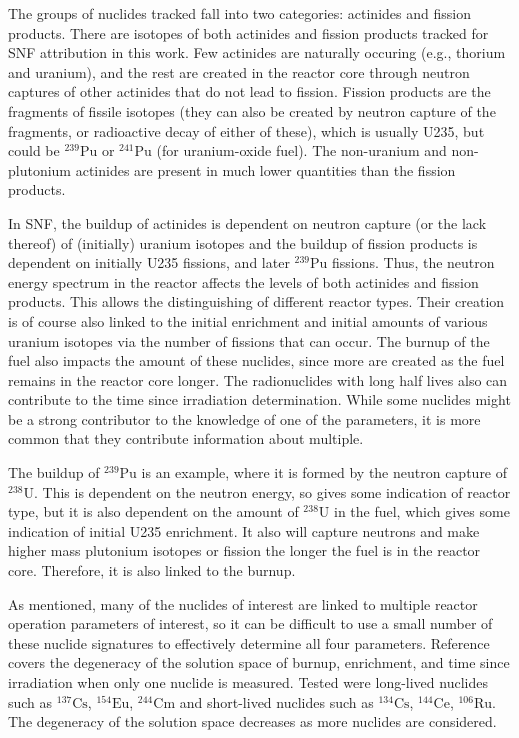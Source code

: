 The groups of nuclides tracked fall into two categories: actinides and fission
products. There are isotopes of both actinides and fission products tracked for
\gls{SNF} attribution in this work.  Few actinides are naturally occuring
(e.g., thorium and uranium), and the rest are created in the reactor core
through neutron captures of other actinides that do not lead to fission.
Fission products are the fragments of fissile isotopes (they can also be
created by neutron capture of the fragments, or radioactive decay of either of
these), which is usually \gls{U235}, but could be ${}^{239}\text{Pu}$ or
${}^{241}\text{Pu}$ (for uranium-oxide fuel).  The non-uranium and
non-plutonium actinides are present in much lower quantities than the fission
products.

In \gls{SNF}, the buildup of actinides is dependent on neutron capture (or the
lack thereof) of (initially) uranium isotopes and the buildup of fission
products is dependent on initially \gls{U235} fissions, and later
${}^{239}\text{Pu}$ fissions.  Thus, the neutron energy spectrum in the reactor
affects the levels of both actinides and fission products.  This allows the
distinguishing of different reactor types.  Their creation is of course also
linked to the initial enrichment and initial amounts of various uranium
isotopes via the number of fissions that can occur.  The burnup of the fuel
also impacts the amount of these nuclides, since more are created as the fuel
remains in the reactor core longer.  The radionuclides with long half lives
also can contribute to the time since irradiation determination. While some
nuclides might be a strong contributor to the knowledge of one of the
parameters, it is more common that they contribute information about multiple. 

The buildup of ${}^{239}\text{Pu}$ is an example, where it is formed by the
neutron capture of ${}^{238}\text{U}$. This is dependent on the neutron energy,
so gives some indication of reactor type, but it is also dependent on the
amount of ${}^{238}\text{U}$ in the fuel, which gives some indication of
initial \gls{U235} enrichment. It also will capture neutrons and make higher
mass plutonium isotopes or fission the longer the fuel is in the reactor core.
Therefore, it is also linked to the burnup.

As mentioned, many of the nuclides of interest are linked to multiple reactor
operation parameters of interest, so it can be difficult to use a small number
of these nuclide signatures to effectively determine all four parameters.
Reference \cite{skutnik_2016} covers the degeneracy of the solution space of
burnup, enrichment, and time since irradiation when only one nuclide is
measured.  Tested were long-lived nuclides such as ${}^{137}\text{Cs}$,
${}^{154}\text{Eu}$, ${}^{244}\text{Cm}$ and short-lived nuclides such as
${}^{134}\text{Cs}$, ${}^{144}\text{Ce}$, ${}^{106}\text{Ru}$. The degeneracy
of the solution space decreases as more nuclides are considered. 

